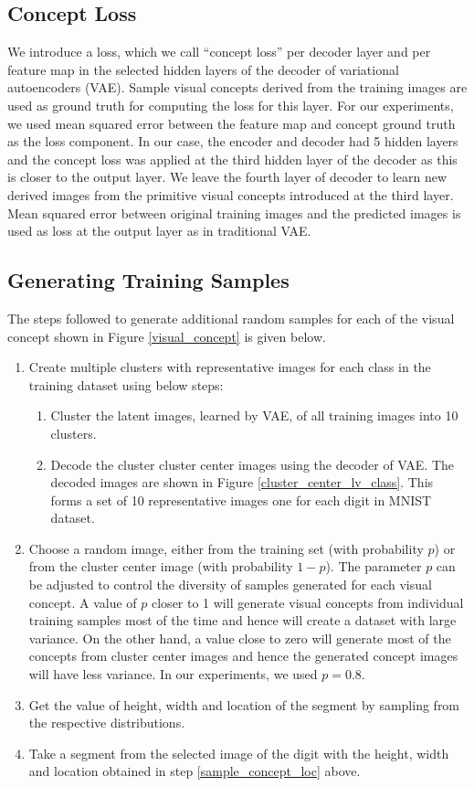 \documentclass[conference]{IEEEtran}
\begin{document}
\subsection{Concept Loss}
We introduce a loss, which we call “concept loss” per  decoder layer and per feature map in the selected hidden layers of the decoder of variational autoencoders (VAE).
Sample visual concepts derived from the training images are used as ground truth for computing the loss for this layer.
For our experiments, we used mean squared error between the feature map and concept ground truth as the loss component.
In our case, the encoder and decoder had 5 hidden layers and the concept loss was applied at the third hidden layer of the decoder as this is closer to the output layer.
We leave the fourth layer of decoder to learn new derived images from the primitive visual concepts introduced at the third layer.
Mean squared error between original training images and the predicted images is used as loss at the output layer as in traditional VAE.

\subsection{Generating Training Samples}

The steps followed to generate additional random samples for each of the  visual concept  shown in Figure \ref{visual_concept} is given below.
\begin{enumerate}
\item Create multiple clusters with representative images for each class in the training dataset using below steps:
 \begin{enumerate}
     \item Cluster the latent images, learned by VAE,  of all training images into 10 clusters.
      \item Decode the cluster cluster center images using the decoder of VAE. The decoded images are shown in Figure \ref{cluster_center_lv_class}. This forms a set of 10  representative images one for each digit in MNIST dataset.
  \end{enumerate}
\item Choose a random image, either from the training set (with probability  $p$) or from the cluster center image (with probability $1-p$).
 The parameter $p$ can be adjusted to control the diversity of samples generated for each visual concept.
A value of $p$ closer to 1 will generate visual concepts from individual training samples most of the time and hence will create a dataset with large variance.
On the other hand, a value close to zero will generate most of the concepts from cluster center images and hence the generated concept images will have less variance. In our experiments, we used $p=0.8$.
\item \label{sample_concept_loc} Get the value of height, width and location of the segment by sampling from the respective distributions.
\item Take a segment from the selected image of the digit with the height, width and location obtained in step \ref{sample_concept_loc} above.
\end{enumerate}
\end{document}
